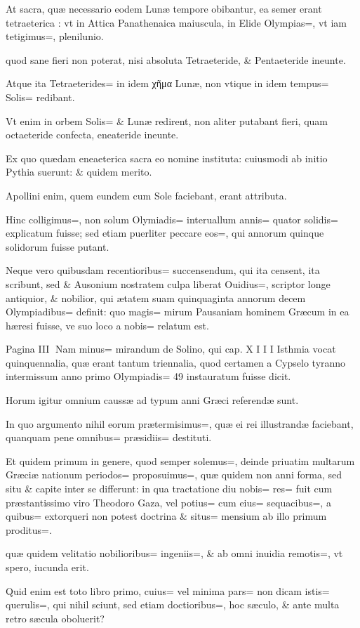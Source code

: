 \begin{parnumbers}
At sacra, quæ necessario eodem Lunæ tempore obibantur, ea semer erant tetraeterica : vt in Attica Panathenaica maiuscula, in Elide Olympias=, vt iam tetigimus=, plenilunio.

quod sane fieri non poterat, nisi absoluta Tetraeteride, \& Pentaeteride ineunte.

Atque ita Tetraeterides= in idem χῆμα Lunæ, non vtique in idem tempus= Solis= redibant.

Vt enim in orbem Solis= \& Lunæ redirent, non aliter putabant fieri, quam octaeteride confecta, eneateride ineunte.

Ex quo quædam eneaeterica sacra eo nomine instituta: cuiusmodi ab initio Pythia suerunt: \& quidem merito.

Apollini enim, quem eundem cum Sole faciebant, erant attributa.

Hinc colligimus=, non solum Olymiadis= interuallum annis= quator solidis= explicatum fuisse; sed etiam puerliter peccare eos=, qui annorum quinque solidorum fuisse putant.

Neque vero quibusdam recentioribus= succensendum, qui ita censent, ita scribunt, sed \& Ausonium nostratem culpa liberat Ouidius=, scriptor longe antiquior, \& nobilior, qui ætatem suam quinquaginta annorum decem Olympiadibus= definit: quo magis= mirum Pausaniam hominem Græcum in ea hæresi fuisse, ve suo loco a nobis= relatum est.

Pagina III
Nam minus= mirandum de Solino, qui cap. X I I I Isthmia vocat quinquennalia, quæ erant tantum triennalia, quod certamen a Cypselo tyranno intermissum anno primo Olympiadis= 49 instauratum fuisse dicit.

Horum igitur omnium caussæ ad typum anni Græci referendæ sunt.

In quo argumento nihil eorum prætermisimus=, quæ ei rei illustrandæ faciebant, quanquam pene omnibus= præsidiis= destituti.

Et quidem primum in genere, quod semper solemus=, deinde priuatim multarum Græciæ nationum periodos= proposuimus=, quæ quidem non anni forma, sed situ \& capite inter se differunt: in qua tractatione diu nobis= res= fuit cum præstantissimo viro Theodoro Gaza, vel potius= cum eius= sequacibus=, a quibus= extorqueri non potest doctrina \& situs= mensium ab illo primum 
proditus=. 

quæ quidem velitatio nobilioribus= ingeniis=, \& ab omni inuidia remotis=, vt spero, iucunda erit.

Quid enim est toto libro primo, cuius= vel minima pars= non dicam istis= querulis=, qui nihil sciunt, sed etiam doctioribus=, hoc sæculo, \& ante multa retro sæcula oboluerit?


\end{parnumbers}
